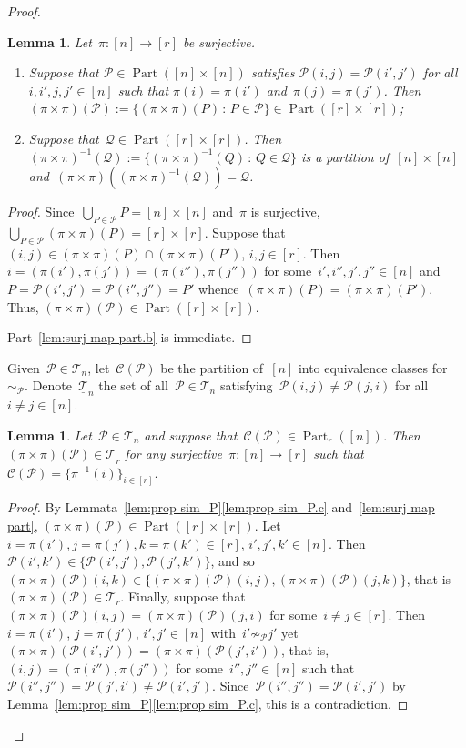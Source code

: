 \documentclass[12pt, reqno]{amsart}
\newtheorem{lemma}[theorem]{Lemma}
\theoremstyle{definition}
\numberwithin{equation}{section}
\newenvironment{enumalph}{\begin{enumerate}[label={\rm(\alph*)},leftmargin=*]}{\end{enumerate}}
\DeclareMathOperator{\Part}{Part}
\begin{document}
\begin{proof}
\begin{lemma}
Let~$\pi:[n]\to[r]$
be surjective. 
\begin{enumalph}
    \item\label{lem:surj map part.a} Suppose that $\mathcal P\in\Part([n]\times[n])$
    satisfies 
    $\mathcal P(i,j)=\mathcal P(i',j')$ for all $i,i',j,j'\in[n]$ such that $\pi(i)=\pi(i')$ and~$\pi(j)=\pi(j')$.
Then~$(\pi\times\pi)(\mathcal P):=\{ (\pi\times\pi)(P)\,:\, P\in\mathcal P\}\in \Part([r]\times[r])$;
\item\label{lem:surj map part.b} Suppose that~$\mathcal Q\in \Part([r]\times[r])$.
Then~$(\pi\times\pi)^{-1}(\mathcal Q):=\{ (\pi\times\pi)^{-1}(Q)\,:\, Q\in\mathcal Q\}$
is a partition of~$[n]\times[n]$ and~$(\pi\times\pi)((\pi\times\pi)^{-1}(\mathcal Q))=\mathcal Q$.
\end{enumalph}
\end{lemma}
\begin{proof}
Since~$\bigcup_{P\in\mathcal P} P=[n]\times[n]$ and~$\pi$
is surjective, $\bigcup_{P\in\mathcal P}
(\pi\times\pi)(P)=[r]\times[r]$. Suppose that~$(i,j)\in 
(\pi\times\pi)(P)\cap(\pi\times\pi)(P')$, $i,j\in[r]$. Then~$i=(\pi(i'),
\pi(j'))=(\pi(i''),\pi(j''))$ for some~$i',i'',j',j''\in[n]$
and~$P=\mathcal P(i',j')=\mathcal P(i'',j'')=P'$
whence~$(\pi\times\pi)(P)=(\pi\times\pi)(P')$.
Thus, $(\pi\times\pi)(\mathcal P)\in\Part([r]\times[r])$.

Part~\ref{lem:surj map part.b} is immediate.
\end{proof}


Given~$\mathcal P\in\mathscr T_n$, let~$\mathcal C(\mathcal P)$ be
the partition of~$[n]$ into equivalence classes for~$\sim_{\mathcal P}$. Denote~$\underline{\mathscr T}_n$ the set of 
all~$\mathcal P\in\mathscr T_n$ satisfying~$\mathcal P(i,j)\not=\mathcal P(j,i)$ for all~$i\not=j\in[n]$.
\begin{lemma}\label{lem:surj trans part}
Let~$\mathcal P\in\mathscr T_n$ and suppose that~$\mathcal C(\mathcal P)\in\Part_r([n])$. Then
$(\pi\times\pi)(\mathcal P)\in \underline{\mathscr T}_r$ 
for any surjective~$\pi:[n]\to[r]$ such that~$\mathcal C(\mathcal P)=\{ \pi^{-1}(i)\}_{i\in[r]}$.
\end{lemma}
\begin{proof}
By
Lemmata~\ref{lem:prop sim_P}\ref{lem:prop sim_P.c} and~\ref{lem:surj map part}, 
$(\pi\times\pi)(\mathcal P)\in\Part([r]\times[r])$. Let~$i=\pi(i'),j=\pi(j'),k=\pi(k')\in[r]$, $i',j',k'\in[n]$.
Then~$\mathcal P(i',k')\in \{ \mathcal P(i',j'),\mathcal P(j',k')\}$,
and so $(\pi\times\pi)(\mathcal P)(i,k)\in\{(\pi\times\pi)(\mathcal P)(i,j),
(\pi\times\pi)(\mathcal P)(j,k)\}$, that is~$(\pi\times\pi)(\mathcal P)\in\mathscr T_r$.
Finally, suppose that~$(\pi\times\pi)(\mathcal P)(i,j)=(\pi\times\pi)(\mathcal P)(j,i)$ 
for some~$i\not=j\in[r]$. Then
$i=\pi(i')$, $j=\pi(j')$, $i',j'\in[n]$ with~$i'\not\sim_{\mathcal P}j'$
yet~$(\pi\times\pi)(\mathcal P(i',j'))=(\pi\times\pi)(\mathcal P(j',i'))$, that
is, $(i,j)=(\pi(i''),\pi(j''))$ for some~$i'',j''\in[n]$ such that~$\mathcal P(i'',j'')=
\mathcal P(j',i')\not=\mathcal P(i',j')$. Since~$\mathcal P(i'',j'')=\mathcal P(i',j')$
by Lemma~\ref{lem:prop sim_P}\ref{lem:prop sim_P.c}, this is a contradiction.
\end{proof}


\end{proof}
\end{document}
